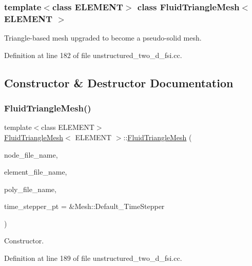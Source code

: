\subsubsection*{template$<$class E\+L\+E\+M\+E\+NT$>$\newline
class Fluid\+Triangle\+Mesh$<$ E\+L\+E\+M\+E\+N\+T $>$}

Triangle-\/based mesh upgraded to become a pseudo-\/solid mesh. 

Definition at line 182 of file unstructured\+\_\+two\+\_\+d\+\_\+fsi.\+cc.



\subsection{Constructor \& Destructor Documentation}
\mbox{\label{classFluidTriangleMesh_ab86c8fd8ee699923f5a4b199981d8c76}} 
\subsubsection{\texorpdfstring{Fluid\+Triangle\+Mesh()}{FluidTriangleMesh()}}
{\footnotesize\ttfamily template$<$class E\+L\+E\+M\+E\+NT$>$ \\
\hyperlink{classFluidTriangleMesh}{Fluid\+Triangle\+Mesh}$<$ E\+L\+E\+M\+E\+NT $>$\+::\hyperlink{classFluidTriangleMesh}{Fluid\+Triangle\+Mesh} (\begin{DoxyParamCaption}\item[{const std\+::string \&}]{node\+\_\+file\+\_\+name,  }\item[{const std\+::string \&}]{element\+\_\+file\+\_\+name,  }\item[{const std\+::string \&}]{poly\+\_\+file\+\_\+name,  }\item[{Time\+Stepper $\ast$}]{time\+\_\+stepper\+\_\+pt = {\ttfamily \&Mesh\+:\+:Default\+\_\+TimeStepper} }\end{DoxyParamCaption})\hspace{0.3cm}{\ttfamily [inline]}}



Constructor. 



Definition at line 189 of file unstructured\+\_\+two\+\_\+d\+\_\+fsi.\+cc.

